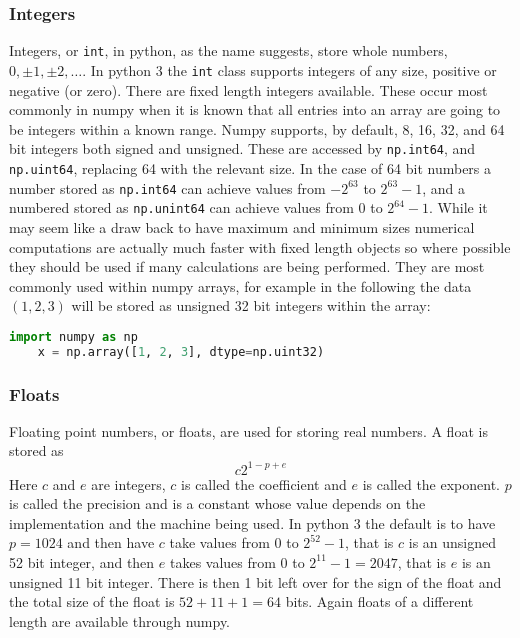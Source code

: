\documentclass[a4paper]{article}
\begin{document}
    \subsubsection{Integers}
    Integers, or \lstinline|int|, in python, as the name suggests, store whole numbers, \(0, \pm 1, \pm 2, \dotsc\).
    In python 3 the \lstinline|int| class supports integers of any size, positive or negative (or zero).
    There are fixed length integers available.
    These occur most commonly in numpy when it is known that all entries into an array are going to be integers within a known range.
    Numpy supports, by default, 8, 16, 32, and 64 bit integers both signed and unsigned.
    These are accessed by \lstinline|np.int64|, and \lstinline|np.uint64|, replacing 64 with the relevant size.
    In the case of 64 bit numbers a number stored as \lstinline|np.int64| can achieve values from \(-2^{63}\) to \(2^{63} - 1\), and a numbered stored as \lstinline|np.unint64| can achieve values from \(0\) to \(2^{64} - 1\).
    While it may seem like a draw back to have maximum and minimum sizes numerical computations are actually much faster with fixed length objects so where possible they should be used if many calculations are being performed.
    They are most commonly used within numpy arrays, for example in the following the data \((1, 2, 3)\) will be stored as unsigned 32 bit integers within the array:
    \begin{lstlisting}[language=python]
    import numpy as np
    x = np.array([1, 2, 3], dtype=np.uint32)
    \end{lstlisting}
    \subsubsection{Floats}
    Floating point numbers, or floats, are used for storing real numbers.
    A float is stored as
    \[c2^{1 - p + e}\]
    Here \(c\) and \(e\) are integers, \(c\) is called the coefficient and \(e\) is called the exponent.
    \(p\) is called the precision and is a constant whose value depends on the implementation and the machine being used.
    In python 3 the default is to have \(p = 1024\) and then have \(c\) take values from 0 to \(2^{52} - 1\), that is \(c\) is an unsigned 52 bit integer, and then \(e\) takes values from 0 to \(2^{11} - 1 = 2047\), that is \(e\) is an unsigned 11 bit integer.
    There is then 1 bit left over for the sign of the float and the total size of the float is \(52 + 11 + 1 = 64\) bits.
    Again floats of a different length are available through numpy.
    
\end{document}
